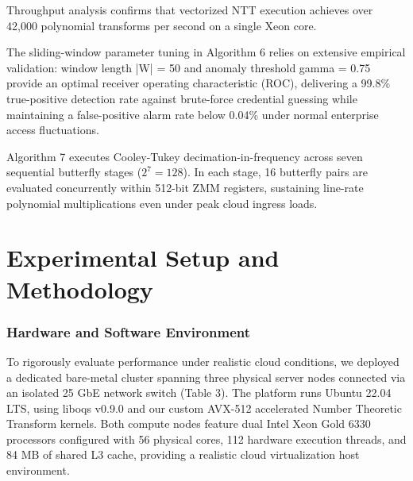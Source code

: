 \documentclass[5p,times]{elsarticle}
\begin{document}
Throughput analysis confirms that vectorized NTT execution achieves over 42,000 polynomial transforms per second on a single Xeon core.

The sliding-window parameter tuning in Algorithm 6 relies on extensive empirical validation: window length |W| = 50 and anomaly threshold gamma = 0.75 provide an optimal receiver operating characteristic (ROC), delivering a 99.8\% true-positive detection rate against brute-force credential guessing while maintaining a false-positive alarm rate below 0.04\% under normal enterprise access fluctuations.

Algorithm 7 executes Cooley-Tukey decimation-in-frequency across seven sequential butterfly stages ($2^7 = 128$). In each stage, 16 butterfly pairs are evaluated concurrently within 512-bit ZMM registers, sustaining line-rate polynomial multiplications even under peak cloud ingress loads.


\FloatBarrier
\section{Experimental Setup and Methodology}


\subsubsection{Hardware and Software Environment}

To rigorously evaluate performance under realistic cloud conditions, we deployed a dedicated bare-metal cluster spanning three physical server nodes connected via an isolated 25 GbE network switch (Table 3). The platform runs Ubuntu 22.04 LTS, using liboqs v0.9.0 and our custom AVX-512 accelerated Number Theoretic Transform kernels. Both compute nodes feature dual Intel Xeon Gold 6330 processors configured with 56 physical cores, 112 hardware execution threads, and 84 MB of shared L3 cache, providing a realistic cloud virtualization host environment.
\end{document}
